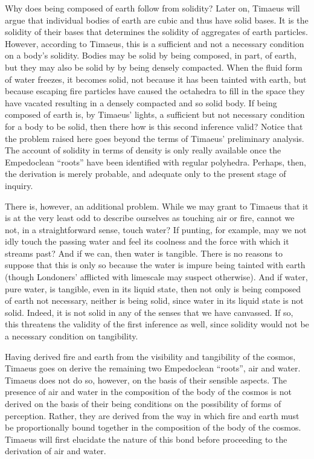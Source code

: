 Why does being composed of earth follow from solidity? Later on, Timaeus will argue that individual bodies of earth are cubic and thus have solid bases. It is the solidity of their bases that determines the solidity of aggregates of earth particles. However, according to Timaeus, this is a sufficient and not a necessary condition on a body's solidity. Bodies may be solid by being composed, in part, of earth, but they may also be solid by by being densely compacted. When the fluid form of water freezes, it becomes solid, not because it has been tainted with earth, but because escaping fire particles have caused the octahedra to fill in the space they have vacated resulting in a densely compacted and so solid body. If being composed of earth is, by Timaeus' lights, a sufficient but not necessary condition for a body to be solid, then there how is this second inference valid? Notice that the problem raised here goes beyond the terms of Timaeus' preliminary analysis. The account of solidity in terms of density is only really available once the Empedoclean ``roots'' have been identified with regular polyhedra. Perhaps, then, the derivation is merely probable, and adequate only to the present stage of inquiry.

There is, however, an additional problem. While we may grant to Timaeus that it is at the very least odd to describe ourselves as touching air or fire, cannot we not, in a straightforward sense, touch water? If punting, for example, may we not idly touch the passing water and feel its coolness and the force with which it streams past? And if we can, then water is tangible. There is no reasons to suppose that this is only so because the water is impure being tainted with earth (though Londoners' afflicted with limescale may suspect otherwise). And if water, pure water, is tangible, even in its liquid state, then not only is being composed of earth not necessary, neither is being solid, since water in its liquid state is not solid. Indeed, it is not solid in any of the senses that we have canvassed. If so, this threatens the validity of the first inference as well, since solidity would not be a necessary condition on tangibility. 

Having derived fire and earth from the visibility and tangibility of the cosmos, Timaeus goes on derive the remaining two Empedoclean ``roots'', air and water. Timae\-us does not do so, however, on the basis of their sensible aspects. The presence of air and water in the composition of the body of the cosmos is not derived on the basis of their being conditions on the possibility of forms of perception. Rather, they are derived from the way in which fire and earth must be proportionally bound together in the composition of the body of the cosmos. Timaeus will first elucidate the nature of this bond before proceeding to the derivation of air and water.

